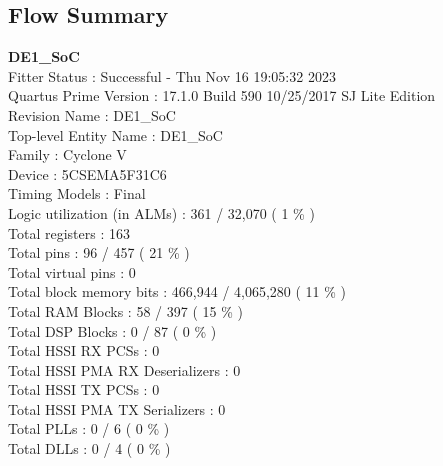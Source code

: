 \documentclass[11pt, titlepage]{article}
\begin{document}
        \subsection{Flow Summary}
            \begin{description}
                \item \textbf{DE1\_SoC} \\
                    Fitter Status : Successful - Thu Nov 16 19:05:32 2023 \\
                    Quartus Prime Version : 17.1.0 Build 590 10/25/2017 SJ  Lite Edition \\
                    Revision Name : DE1\_SoC \\
                    Top-level Entity Name : DE1\_SoC \\
                    Family : Cyclone V \\
                    Device : 5CSEMA5F31C6 \\
                    Timing Models : Final \\
                    Logic utilization (in ALMs) : 361 / 32,070 ( 1 \% ) \\
                    Total registers : 163 \\
                    Total pins : 96 / 457 ( 21 \% ) \\
                    Total virtual pins : 0 \\
                    Total block memory bits : 466,944 / 4,065,280 ( 11 \% ) \\
                    Total RAM Blocks : 58 / 397 ( 15 \% ) \\
                    Total DSP Blocks : 0 / 87 ( 0 \% ) \\
                    Total HSSI RX PCSs : 0 \\
                    Total HSSI PMA RX Deserializers : 0 \\
                    Total HSSI TX PCSs : 0 \\
                    Total HSSI PMA TX Serializers : 0 \\
                    Total PLLs : 0 / 6 ( 0 \% ) \\
                    Total DLLs : 0 / 4 ( 0 \% ) \\


\end{description}
\end{document}
